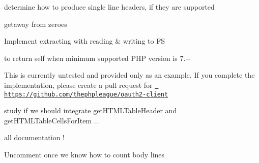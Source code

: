 \begin{DoxyRefList}
%
determine how to produce single line headers, if they are supported  
\item[\doxylink{report_8contract_8php_a77b973d137fb33212e018b042df6e3e7}{Global(e)} \doxylink{class_swaggest_1_1_json_schema_1_1_helper_a428a985b27a671b5891f575b188f97a4}{Helper\+::resolve\+URI} (\$parent, \$current)]\label{todo__todo000046}%
%
getaway from zeroes  
\item[\doxylink{report_8contract_8php_a77b973d137fb33212e018b042df6e3e7}{Global(e)} \doxylink{classwapmorgan_1_1_unified_archive_1_1_drivers_1_1_iso_a5581bb5a463707733f5f2443180d0218}{Iso\+::extract\+Archive} (\$output\+Folder)]\label{todo__todo000050}%
%
Implement extracting with reading \& writing to FS  
\item[\doxylink{report_8contract_8php_a77b973d137fb33212e018b042df6e3e7}{Global(e)} \doxylink{namespace_laminas_1_1_mail_1_1_protocol_a801d1842a28565ff02993b526ba0c693}{Laminas\+::Mail\+::Protocol\+::set\+No\+Validate\+Cert} (bool \$novalidatecert)]\label{todo__todo000019}%
%
 to return self when minimum supported PHP version is 7.+  
\item[\doxylink{report_8contract_8php_a77b973d137fb33212e018b042df6e3e7}{Global(e)} \doxylink{namespace_league_1_1_o_auth2_1_1_client_1_1_tool_ae6e9cbc764115b3a2ea02c42dadf9c19}{League\+::OAuth2\+::Client\+::Tool\+::get\+Authorization\+Headers} (\$token=null)]\label{todo__todo000030}%
%
This is currently untested and provided only as an example. If you complete the implementation, please create a pull request for \href{https://github.com/thephpleague/oauth2-client}{\texttt{ https\+://github.\+com/thephpleague/oauth2-\/client}}  
\item[Class \doxylink{class_manufacturer}{Manufacturer} ]\label{todo__todo000005}%
%
study if we should integrate get\+HTMLTable\+Header and get\+HTMLTable\+Cells\+For\+Item ...  
\item[Class \doxylink{class_massive_action}{Massive\+Action} ]\label{todo__todo000006}%
%
all documentation ! 
\item[\doxylink{report_8contract_8php_a77b973d137fb33212e018b042df6e3e7}{Global(e)} \doxylink{class_laminas_1_1_mail_1_1_storage_1_1_mbox_a86ea515928072d5f7cf1f112d3031782}{Mbox\+::get\+Message} (\$id)]\label{todo__todo000020}%
%
Uncomment once we know how to count body lines  

\end{DoxyRefList}
